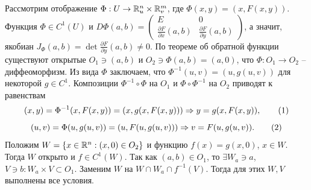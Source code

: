 \begin{myproof}
	Рассмотрим отображение $\Phi : U \to \mathbb{R}^n_u \times \mathbb{R}^m_v$, где $\Phi(x, y) = (x, F(x, y))$. 
	Функция $\Phi \in C^1(U)$ и $D \Phi (a, b) = \begin{pmatrix}
		E & 0 \\ 
		\frac{\partial F}{\partial x}(a, b) & \frac{\partial F}{\partial y}(a, b) 
	\end{pmatrix}$, а значит, якобиан $J_{\Phi}(a, b) = \det \frac{\partial F}{\partial y}(a, b) \neq 0$. 
	По теореме об обратной функции существуют открытые $O_1 \ni (a, b)$ и $O_2 \ni \Phi(a, b) = (a, 0)$, что 
	$\Phi : O_1 \to O_2$ -- диффеоморфизм. 
	Из вида $\Phi$ заключаем, что $\Phi^{-1}(u, v) = (u, g(u, v))$ для некоторой $g \in C^1$.
	Композиции $\Phi^{-1} \circ \Phi$ на $O_1$ и $\Phi \circ \Phi^{-1}$ на $O_2$ приводят к равенствам 
	\[ (x, y) = \Phi^{-1}(x, F(x, y)) = (x, g(x, F(x, y))) \Rightarrow y = g(x, F(x, y)), \tag{1} \]
	\[ (u, v) = \Phi(u, g(u, v)) = (u, F(u, g(u, v))) \Rightarrow v = F(u, g(u, v)). \tag{2} \]
	Положим $W = \{x \in \mathbb{R}^n : (x, 0) \in O_2\}$ и функцию $f(x) = g(x, 0)$, $x \in W$. 
	Тогда $W$ открыто и $f \in C^1(W)$.
	Так как $(a, b) \in O_1$, то $\exists W_a \ni a$, $V \ni b : W_a \times V \subset O_1$. 
	Заменим $W$ на $W \cap W_a \cap f^{-1}(V)$. 
	Тогда для этих $W, V$ выполнены все условия. 

	\begin{figure}[h!]
\centering
\begin{framed}

\end{framed}
\end{figure}
\end{myproof}
